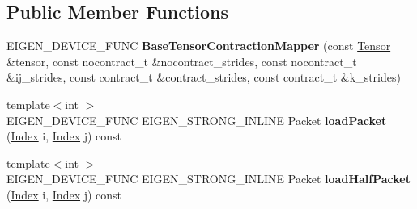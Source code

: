 \subsection*{Public Member Functions}
\begin{DoxyCompactItemize}
\item 
\mbox{\label{class_eigen_1_1internal_1_1_base_tensor_contraction_mapper_3_01_scalar_00_01_index_00_01side_00_080d560a1738baff9d26ac7a1ec9763b_a545fb30e6d97ebe62beb82d23f67a045}} 
E\+I\+G\+E\+N\+\_\+\+D\+E\+V\+I\+C\+E\+\_\+\+F\+U\+NC {\bfseries Base\+Tensor\+Contraction\+Mapper} (const \hyperlink{class_eigen_1_1_tensor}{Tensor} \&tensor, const nocontract\+\_\+t \&nocontract\+\_\+strides, const nocontract\+\_\+t \&ij\+\_\+strides, const contract\+\_\+t \&contract\+\_\+strides, const contract\+\_\+t \&k\+\_\+strides)
\item 
\mbox{\label{class_eigen_1_1internal_1_1_base_tensor_contraction_mapper_3_01_scalar_00_01_index_00_01side_00_080d560a1738baff9d26ac7a1ec9763b_a7ef2916430d4f9383738f62f570a12d4}} 
{\footnotesize template$<$int $>$ }\\E\+I\+G\+E\+N\+\_\+\+D\+E\+V\+I\+C\+E\+\_\+\+F\+U\+NC E\+I\+G\+E\+N\+\_\+\+S\+T\+R\+O\+N\+G\+\_\+\+I\+N\+L\+I\+NE Packet {\bfseries load\+Packet} (\hyperlink{namespace_eigen_a62e77e0933482dafde8fe197d9a2cfde}{Index} i, \hyperlink{namespace_eigen_a62e77e0933482dafde8fe197d9a2cfde}{Index} j) const
\item 
\mbox{\label{class_eigen_1_1internal_1_1_base_tensor_contraction_mapper_3_01_scalar_00_01_index_00_01side_00_080d560a1738baff9d26ac7a1ec9763b_ad5541b1c9ad2606364bd6cbbe1822388}} 
{\footnotesize template$<$int $>$ }\\E\+I\+G\+E\+N\+\_\+\+D\+E\+V\+I\+C\+E\+\_\+\+F\+U\+NC E\+I\+G\+E\+N\+\_\+\+S\+T\+R\+O\+N\+G\+\_\+\+I\+N\+L\+I\+NE Packet {\bfseries load\+Half\+Packet} (\hyperlink{namespace_eigen_a62e77e0933482dafde8fe197d9a2cfde}{Index} i, \hyperlink{namespace_eigen_a62e77e0933482dafde8fe197d9a2cfde}{Index} j) const
\item 

\end{DoxyCompactItemize}
